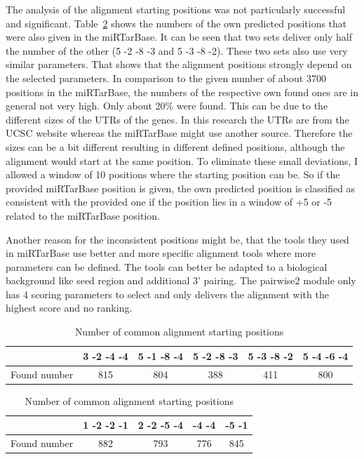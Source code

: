 \documentclass[12pt]{article}
\begin{document}
The analysis of the alignment starting positions was not particularly successful and significant. Table~\ref{tab:positions} shows the numbers of the own predicted positions that were also given in the miRTarBase. It can be seen that two sets deliver only half the number of the other (5 -2 -8 -3 and 5 -3 -8 -2). These two sets also use very similar parameters. That shows that the alignment positions strongly depend on the selected parameters. In comparison to the given number of about 3700 positions in the miRTarBase, the numbers of the respective own found ones are in general not very high. Only about 20\% were found. This can be due to the different sizes of the UTRs of the genes. In this research the UTRs are from the UCSC website whereas the miRTarBase might use another source. Therefore the sizes can be a bit different resulting in different defined positions, although the alignment would start at the same position. To eliminate these small deviations, I allowed a window of 10 positions where the starting position can be. So if the provided miRTarBase position is given, the own predicted position is classified as consistent with the provided one if the position lies in a window of +5 or -5 related to the miRTarBase position. 

Another reason for the inconsistent positions might be, that the tools they used in miRTarBase use better and more specific alignment tools where more parameters can be defined. The tools can better be adapted to a biological background like seed region and additional 3' pairing. The pairwise2 module only has 4 scoring parameters to select and only delivers the alignment with the highest score and no ranking.  \\



\begin{table} [h]
\caption{Number of common alignment starting positions}
\vspace{0.3cm}
\begin{tabular}{c||c|c|c|c|c} 
& 3 -2 -4 -4 & 5 -1 -8 -4 & 5 -2 -8 -3 & 5 -3 -8 -2 & 5 -4 -6 -4  \\
\hline\hline
Found number & 815 & 804 & 388 & 411 & 800\\
\hline
\end{tabular}
\vspace{0.5cm}

\begin{tabular}{c||c|c|c|c}
& 1 -2 -2 -1 & 2 -2 -5 -4 & -4 -4 & -5 -1 \\
\hline\hline
Found number & 882 & 793 & 776 & 845  \\
\hline
\end{tabular}
\label{tab:positions}
\end{table}
\end{document}
